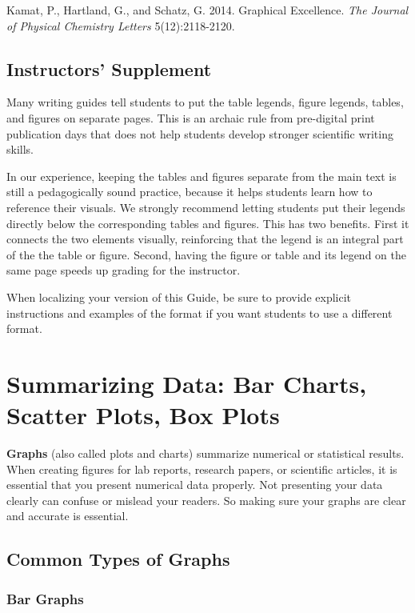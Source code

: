 \documentclass[
]{book}
\begin{document}
Kamat, P., Hartland, G., and Schatz, G. 2014. Graphical Excellence. \emph{The Journal of Physical Chemistry Letters} 5(12):2118-2120.

\hypertarget{instructors-supplement-3}{%
\section{Instructors' Supplement}\label{instructors-supplement-3}}

Many writing guides tell students to put the table legends, figure legends, tables, and figures on separate pages. This is an archaic rule from pre-digital print publication days that does not help students develop stronger scientific writing skills.

In our experience, keeping the tables and figures separate from the main text is still a pedagogically sound practice, because it helps students learn how to reference their visuals. We strongly recommend letting students put their legends directly below the corresponding tables and figures. This has two benefits. First it connects the two elements visually, reinforcing that the legend is an integral part of the the table or figure. Second, having the figure or table and its legend on the same page speeds up grading for the instructor.

When localizing your version of this Guide, be sure to provide explicit instructions and examples of the format if you want students to use a different format.

\hypertarget{chartsone425}{%
\chapter{Summarizing Data: Bar Charts, Scatter Plots, Box Plots}\label{chartsone425}}

\textbf{Graphs} (also called plots and charts) summarize numerical or statistical results. When creating figures for lab reports, research papers, or scientific articles, it is essential that you present numerical data properly. Not presenting your data clearly can confuse or mislead your readers. So making sure your graphs are clear and accurate is essential.

\hypertarget{common-types-of-graphs}{%
\section{Common Types of Graphs}\label{common-types-of-graphs}}

\hypertarget{bar-graphs}{%
\subsection{Bar Graphs}\label{bar-graphs}}
\end{document}
